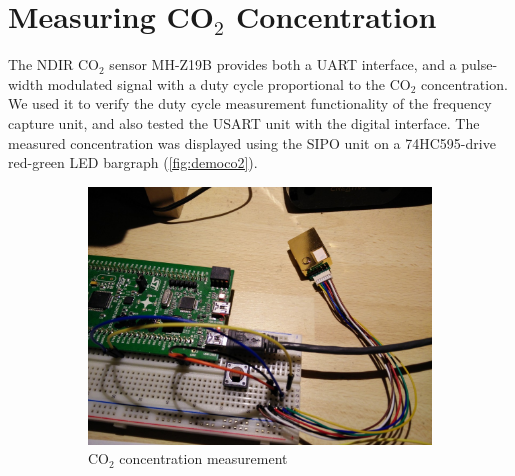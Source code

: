 \section{Measuring \texorpdfstring{CO$_2$}{CO2} Concentration}

The \gls{NDIR} CO$_2$ sensor MH-Z19B provides both a \gls{UART} interface, and a pulse-width modulated signal with a duty cycle proportional to the CO$_2$ concentration. 
We used it to verify the duty cycle measurement functionality of the frequency capture unit, and also tested the \gls{USART} unit with the digital interface. The measured concentration was displayed using the \gls{SIPO} unit on a 74HC595-drive red-green \gls{LED} bargraph (\cref{fig:democo2}).

\begin{figure}[H]
	\centering
	\begin{subfigure}{.72\textwidth}
		\includegraphics[width=.98\textwidth]{img/ph-co2.jpg}
		\caption{CO$_2$ concentration measurement}
	\end{subfigure}%
	\begin{subfigure}{.28\textwidth}

\end{subfigure}
\end{figure}

